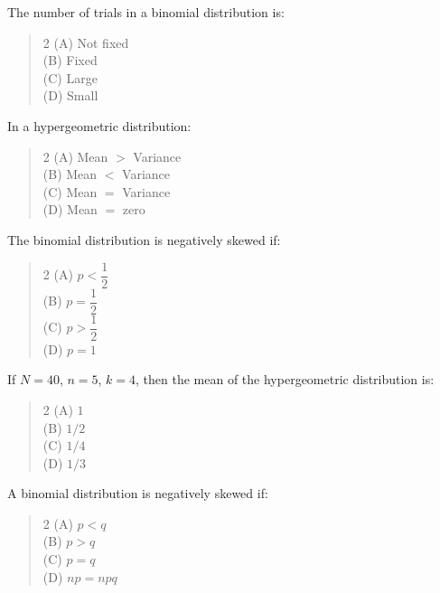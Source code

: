 \documentclass[11pt,a4paper]{article}
\begin{document}
\begin{mcqlist}
\item The number of trials in a binomial distribution is:
\begin{quote}\begin{multicols}{2}
\noindent (A) Not fixed \\
(B) Fixed \\
(C) Large \\
(D) Small
\end{multicols}\end{quote}

\item In a hypergeometric distribution:
\begin{quote}\begin{multicols}{2}
\noindent (A) Mean $>$ Variance \\
(B) Mean $<$ Variance \\
(C) Mean $=$ Variance \\
(D) Mean $=$ zero
\end{multicols}\end{quote}

\item The binomial distribution is negatively skewed if:
\begin{quote}\begin{multicols}{2}
\noindent (A) $p<\dfrac{1}{2}$ \\
(B) $p=\dfrac{1}{2}$ \\
(C) $p>\dfrac{1}{2}$ \\
(D) $p=1$
\end{multicols}\end{quote}

\item If $N=40$, $n=5$, $k=4$, then the mean of the hypergeometric distribution is:
\begin{quote}\begin{multicols}{2}
\noindent (A) $1$ \\
(B) $1/2$ \\
(C) $1/4$ \\
(D) $1/3$
\end{multicols}\end{quote}

\item A binomial distribution is negatively skewed if:
\begin{quote}\begin{multicols}{2}
\noindent (A) $p<q$ \\
(B) $p>q$ \\
(C) $p=q$ \\
(D) $np=npq$
\end{multicols}\end{quote}

\end{mcqlist}
\end{document}
